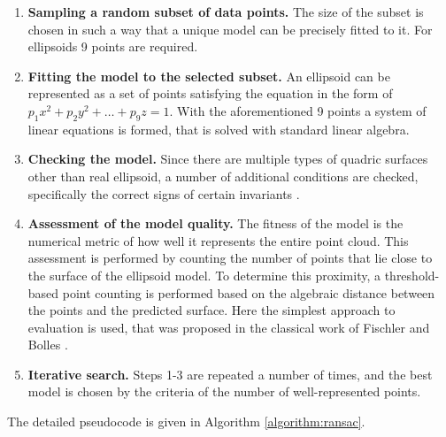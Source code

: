 \begin{enumerate}
\item \textbf{Sampling a random subset of data points.}
The size of the subset is chosen in such a way that a unique model can be precisely fitted to it. For ellipsoids 9 points are required. 
\item \textbf{Fitting the model to the selected subset.}
An ellipsoid can be represented as a set of points satisfying the equation in the form of $p_1 x^2 + p_2 y^2 + \dots + p_9 z = 1$. With the aforementioned 9 points a system of linear equations is formed, that is solved with standard linear algebra.
\item \textbf{Checking the model.}
Since there are multiple types of quadric surfaces other than real ellipsoid, a number of additional conditions are checked, specifically the correct signs of certain invariants \cite{andrews2014type}.
\item \textbf{Assessment of the model quality.}
The fitness of the model is the numerical metric of how well it represents the entire point cloud. This assessment is performed by counting the number of points that lie close to the surface of the ellipsoid model. To determine this proximity, a threshold-based point counting is performed based on the algebraic distance between the points and the predicted surface. Here the simplest approach to evaluation is used, that was proposed in the classical work of Fischler and Bolles \cite{fischler1981random}.
\item \textbf{Iterative search.}
Steps 1-3 are repeated a number of times, and the best model is chosen by the criteria of the number of well-represented points.
\end{enumerate}

The detailed pseudocode is given in Algorithm \ref{algorithm:ransac}.

